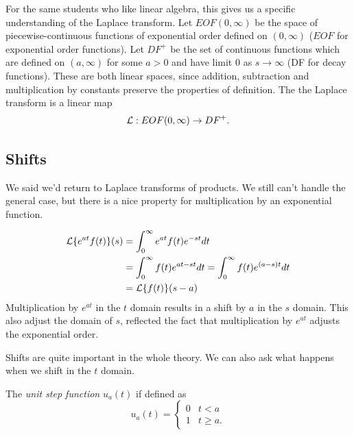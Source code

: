 \documentclass[fleqn,letterpaper]{report}
\begin{document}
For the same students who like linear algebra, this gives us a
specific understanding of the Laplace transform.  Let
$EOF(0,\infty)$ be the space of piecewise-continuous functions
of exponential order defined on $(0, \infty)$ ($EOF$ for
exponential order functions). Let $DF^+$ be the set of
continuous functions which are defined on $(a, \infty)$ for
some $a > 0$ and have limit $0$ as $s \rightarrow \infty$ (DF
for decay functions). These are both linear spaces, since
addition, subtraction and multiplication by constants preserve
the properties of definition. The the Laplace transform is a
linear map
\begin{equation*}
\mathcal{L} : EOF(0,\infty) \rightarrow DF^+.
\end{equation*}

\subsection{Shifts}
\label{shifts}

We said we'd return to Laplace transforms of products. We
still can't handle the general case, but there is a nice
property for multiplication by an exponential function.

\begin{prop}
\begin{align*}
\mathcal{L} \{ e^{at} f(t) \} (s) & = \int_0^\infty e^{at} f(t)
e^{-st} dt \\
& = \int_0^\infty f(t) e^{at-st} dt = \int_0^\infty f(t)
e^{(a-s)t} dt \\
& = \mathcal{L} \{ f(t) \} (s-a)
\end{align*} 
Multiplication by $e^{at}$ in the $t$ domain results in a 
shift by $a$ in the $s$ domain. This also adjust the domain
of $s$, reflected the fact that multiplication by $e^{at}$
adjusts the exponential order.
\end{prop}

Shifts are quite important in the whole theory. We can also
ask what happens when we shift in the $t$ domain. 

\begin{defn}
The \emph{unit step function} $u_a(t)$ if defined as
\begin{equation*}
u_a(t) = \left\{ \begin{matrix} 0 & t < a \\ 1 & t \geq a.
\end{matrix} \right. 
\end{equation*}
\end{defn}
\end{document}
